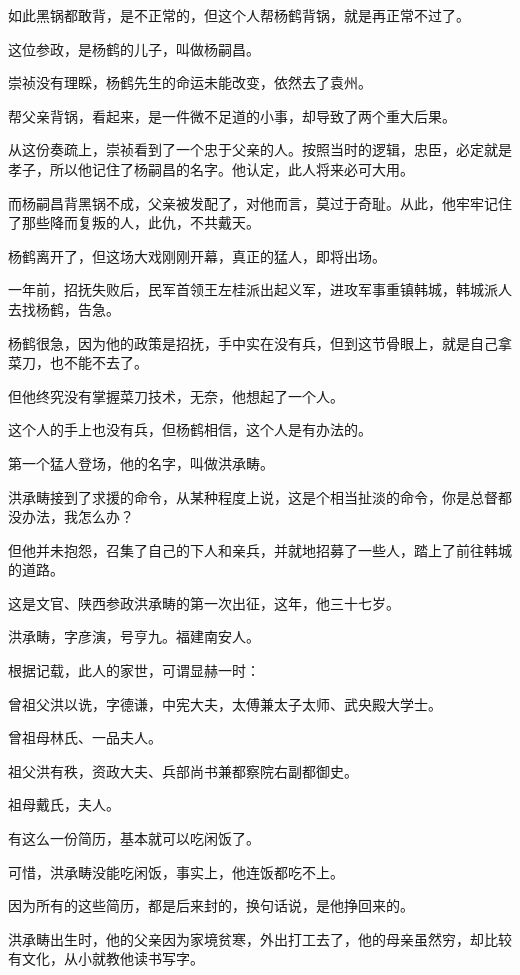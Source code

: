\begin{multicols}{\theparacolNo}
		如此黑锅都敢背，是不正常的，但这个人帮杨鹤背锅，就是再正常不过了。

		这位参政，是杨鹤的儿子，叫做杨嗣昌。

		崇祯没有理睬，杨鹤先生的命运未能改变，依然去了袁州。

		帮父亲背锅，看起来，是一件微不足道的小事，却导致了两个重大后果。

		从这份奏疏上，崇祯看到了一个忠于父亲的人。按照当时的逻辑，忠臣，必定就是孝子，所以他记住了杨嗣昌的名字。他认定，此人将来必可大用。

		而杨嗣昌背黑锅不成，父亲被发配了，对他而言，莫过于奇耻。从此，他牢牢记住了那些降而复叛的人，此仇，不共戴天。

		杨鹤离开了，但这场大戏刚刚开幕，真正的猛人，即将出场。

		一年前，招抚失败后，民军首领王左桂派出起义军，进攻军事重镇韩城，韩城派人去找杨鹤，告急。

		杨鹤很急，因为他的政策是招抚，手中实在没有兵，但到这节骨眼上，就是自己拿菜刀，也不能不去了。

		但他终究没有掌握菜刀技术，无奈，他想起了一个人。

		这个人的手上也没有兵，但杨鹤相信，这个人是有办法的。

		第一个猛人登场，他的名字，叫做洪承畴。

		洪承畴接到了求援的命令，从某种程度上说，这是个相当扯淡的命令，你是总督都没办法，我怎么办？

		但他并未抱怨，召集了自己的下人和亲兵，并就地招募了一些人，踏上了前往韩城的道路。

		这是文官、陕西参政洪承畴的第一次出征，这年，他三十七岁。

		洪承畴，字彦演，号亨九。福建南安人。

		根据记载，此人的家世，可谓显赫一时：

		曾祖父洪以诜，字德谦，中宪大夫，太傅兼太子太师、武央殿大学士。

		曾祖母林氏、一品夫人。

		祖父洪有秩，资政大夫、兵部尚书兼都察院右副都御史。

		祖母戴氏，夫人。

		有这么一份简历，基本就可以吃闲饭了。

		可惜，洪承畴没能吃闲饭，事实上，他连饭都吃不上。

		因为所有的这些简历，都是后来封的，换句话说，是他挣回来的。

		洪承畴出生时，他的父亲因为家境贫寒，外出打工去了，他的母亲虽然穷，却比较有文化，从小就教他读书写字。


\end{multicols}
